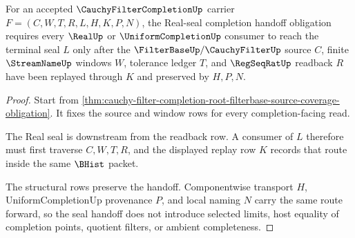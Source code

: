 \begin{theorem}
\label{thm:cauchy-filter-completion-root-real-seal-handoff-obligation}
For an accepted $\CauchyFilterCompletionUp$ carrier $F=(C,W,T,R,L,H,K,P,N)$, the Real-seal completion handoff obligation requires every $\RealUp$ or $\UniformCompletionUp$ consumer to reach the terminal seal $L$ only after the $\FilterBaseUp/\CauchyFilterUp$ source $C$, finite $\StreamNameUp$ windows $W$, tolerance ledger $T$, and $\RegSeqRatUp$ readback $R$ have been replayed through $K$ and preserved by $H,P,N$.
\end{theorem}
\begin{proof}
Start from \autoref{thm:cauchy-filter-completion-root-filterbase-source-coverage-obligation}. It fixes the source and window rows for every completion-facing read.

The Real seal is downstream from the readback row. A consumer of $L$ therefore must first traverse $C,W,T,R$, and the displayed replay row $K$ records that route inside the same $\BHist$ packet.

The structural rows preserve the handoff. Componentwise transport $H$, UniformCompletionUp provenance $P$, and local naming $N$ carry the same route forward, so the seal handoff does not introduce selected limits, host equality of completion points, quotient filters, or ambient completeness.
\end{proof}

